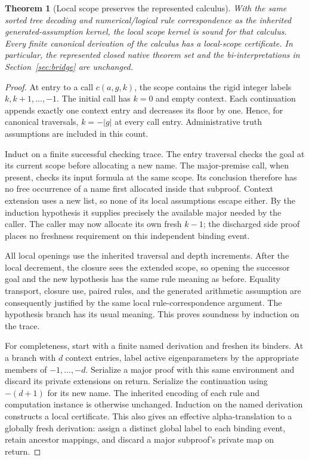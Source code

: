 \documentclass[11pt,letterpaper]{article}
\newtheorem{theorem}{Theorem}[section]
\theoremstyle{definition}\newtheorem{definition}[theorem]{Definition}
\theoremstyle{remark}\newtheorem{remark}[theorem]{Remark}
\begin{document}
\begin{theorem}[Local scope preserves the represented calculus]
\label{thm:local}
With the same sorted tree decoding and numerical/logical rule
correspondence as the inherited generated-assumption kernel, the local
scope kernel is sound for that calculus. Every finite canonical
derivation of the calculus has a local-scope certificate. In particular,
the represented closed native theorem set and the bi-interpretations
in Section~\ref{sec:bridge} are unchanged.
\end{theorem}
\begin{proof}
At entry to a call $c(a,g,k)$, the scope contains the rigid integer
labels $k,k+1,\ldots,-1$. The initial call has $k=0$ and empty
context. Each continuation appends exactly one context entry and
decreases its floor by one. Hence, for canonical traversals,
$k=-|g|$ at every call entry. Administrative truth assumptions are
included in this count.

Induct on a finite successful checking trace. The entry traversal
checks the goal at its current scope before allocating a new name.
The major-premise call, when present, checks its input formula at the
same scope. Its conclusion therefore has no free occurrence of a
name first allocated inside that subproof. Context extension uses a
new list, so none of its local assumptions escape either. By the
induction hypothesis it supplies precisely the available major needed
by the caller. The caller may now allocate its own fresh $k-1$;
the discharged side proof places no freshness requirement on this
independent binding event.

All local openings use the inherited traversal and depth increments.
After the local decrement, the closure sees the extended scope, so
opening the successor goal and the new hypothesis has the same rule
meaning as before. Equality transport, closure use, paired rules, and
the generated arithmetic assumption are consequently justified by
the same local rule-correspondence argument. The hypothesis branch
has its usual meaning. This proves soundness by induction on the trace.

For completeness, start with a finite named derivation and freshen
its binders. At a branch with $d$ context entries, label active
eigenparameters by the appropriate members of $-1,\ldots,-d$.
Serialize a major proof with this same environment and discard its
private extensions on return. Serialize the continuation using
$-(d+1)$ for its new name. The inherited encoding of each rule and
computation instance is otherwise unchanged. Induction on the named
derivation constructs a local certificate. This also gives an
effective alpha-translation to a globally fresh derivation: assign a
distinct global label to each binding event, retain ancestor mappings,
and discard a major subproof's private map on return.
\end{proof}
\end{document}
